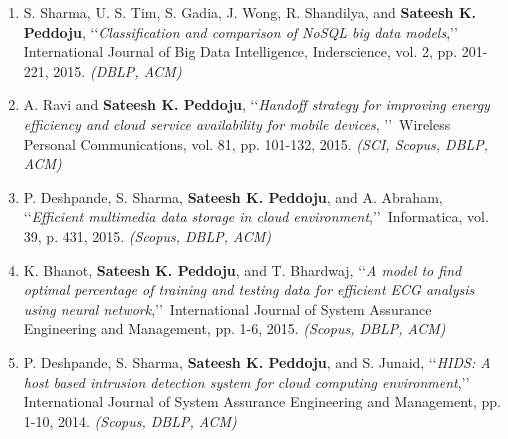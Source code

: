 \begin{enumerate}
	\item
	S. Sharma, U. S. Tim, S. Gadia, J. Wong, R. Shandilya, and \textbf{Sateesh K. Peddoju}, \lq\lq \textit{Classification and comparison of NoSQL big data models},\rq\rq\, International Journal of Big Data Intelligence, Inderscience, vol. 2, pp. 201-221, 2015. \emph{(DBLP, ACM)}
	
	
	\item
	A. Ravi and \textbf{Sateesh K. Peddoju}, \lq\lq \textit{Handoff strategy for improving energy efficiency and cloud service availability for mobile devices}, \rq\rq\, Wireless Personal Communications, vol. 81, pp. 101-132, 2015. \emph{(SCI, Scopus, DBLP, ACM)}
	
	
	\item
	P. Deshpande, S. Sharma, \textbf{Sateesh K. Peddoju}, and A. Abraham, \lq\lq \textit{Efficient multimedia data storage in cloud environment},\rq\rq\, Informatica, vol. 39, p. 431, 2015. \emph{(Scopus, DBLP, ACM)}
	
	\item
	K. Bhanot, \textbf{Sateesh K. Peddoju}, and T. Bhardwaj, \lq\lq \textit{A model to find optimal percentage of training and testing data for efficient ECG analysis using neural network},\rq\rq\, International Journal of System Assurance Engineering and Management, pp. 1-6, 2015. \emph{(Scopus, DBLP, ACM)}
	
	\item
	P. Deshpande, S. Sharma, \textbf{Sateesh K. Peddoju}, and S. Junaid, \lq\lq \textit{HIDS: A host based intrusion detection system for cloud computing environment},\rq\rq\, International Journal of System Assurance Engineering and Management, pp. 1-10, 2014. \emph{(Scopus, DBLP, ACM)}
	
	
	
	
\end{enumerate}		